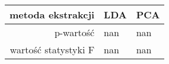 \begin{tabular}{|r|l|l|}
  \hline
  metoda ekstrakcji & LDA & PCA \\
  \hline
  p-wartość &     nan &     nan \\
  \hline
  wartość statystyki F & nan & nan \\
  \hline
\end{tabular}
